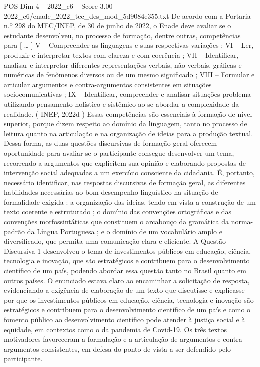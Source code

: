 \begin{textsample}{POS Dim 4 – 2022\_c6 – Score 3.00 – 2022\_c6/enade\_2022\_tec\_des\_mod\_5d9084e355.txt}
De acordo com a Portaria n.º 298 do MEC/INEP, de 30 de junho de 2022, o Enade deve avaliar se o estudante desenvolveu, no processo de formação, dentre outras, competências para [ … ] V – Compreender as linguagens e suas respectivas variações ; VI – Ler, produzir e interpretar textos com clareza e com coerência ; VII – Identificar, analisar e interpretar diferentes representações verbais, não verbais, gráficas e numéricas de fenômenos diversos ou de um mesmo significado ; VIII – Formular e articular argumentos e contra-argumentos consistentes em situações sociocomunicativas ; IX – Identificar, compreender e analisar situações-problema utilizando pensamento holístico e sistêmico ao se abordar a complexidade da realidade. ( INEP, 2022d ) Essas competências são essenciais à formação de nível superior, porque dizem respeito ao domínio da linguagem, tanto no processo de leitura quanto na articulação e na organização de ideias para a produção textual.
Dessa forma, as duas questões discursivas de formação geral oferecem oportunidade para avaliar se o participante consegue desenvolver um tema, recorrendo a argumentos que explicitem sua opinião e elaborando propostas de intervenção social adequadas a um exercício consciente da cidadania.
É, portanto, necessário identificar, nas respostas discursivas de formação geral, as diferentes habilidades necessárias ao bom desempenho linguístico na situação de formalidade exigida : a organização das ideias, tendo em vista a construção de um texto coerente e estruturado ; o domínio das convenções ortográficas e das convenções morfossintáticas que constituem o arcabouço da gramática da norma-padrão da Língua Portuguesa ; e o domínio de um vocabulário amplo e diversificado, que permita uma comunicação clara e eficiente.
A Questão Discursiva 1 desenvolveu o tema de investimentos públicos em educação, ciência, tecnologia e inovação, que são estratégicos e contribuem para o desenvolvimento científico de um país, podendo abordar essa questão tanto no Brasil quanto em outros países.
O enunciado estava claro ao encaminhar a solicitação de resposta, evidenciando a exigência de elaboração de um texto que discutisse e explicasse por que os investimentos públicos em educação, ciência, tecnologia e inovação são estratégicos e contribuem para o desenvolvimento científico de um país e como o fomento público ao desenvolvimento científico pode atender à justiça social e à equidade, em contextos como o da pandemia de Covid-19.
Os três textos motivadores favoreceram a formulação e a articulação de argumentos e contra-argumentos consistentes, em defesa do ponto de vista a ser defendido pelo participante.

\end{textsample}
